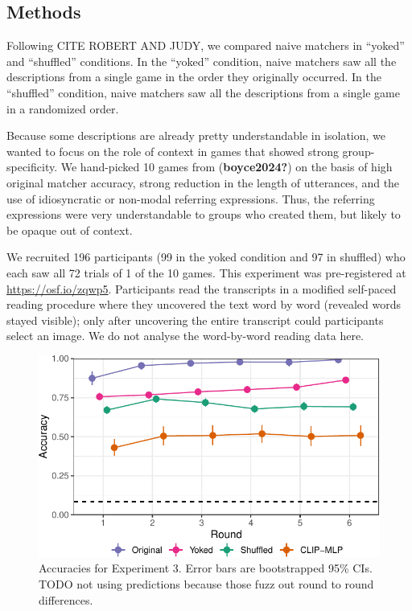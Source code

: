 \documentclass[10pt, letterpaper]{article}
\begin{document}
\subsection{Methods}\label{methods-1}

Following CITE ROBERT AND JUDY, we compared naive matchers in ``yoked''
and ``shuffled'' conditions. In the ``yoked'' condition, naive matchers
saw all the descriptions from a single game in the order they originally
occurred. In the ``shuffled'' condition, naive matchers saw all the
descriptions from a single game in a randomized order.

Because some descriptions are already pretty understandable in
isolation, we wanted to focus on the role of context in games that
showed strong group-specificity. We hand-picked 10 games from
(\textbf{boyce2024?}) on the basis of high original matcher accuracy,
strong reduction in the length of utterances, and the use of
idiosyncratic or non-modal referring expressions. Thus, the referring
expressions were very understandable to groups who created them, but
likely to be opaque out of context.

We recruited 196 participants (99 in the yoked condition and 97 in
shuffled) who each saw all 72 trials of 1 of the 10 games. This
experiment was pre-registered at \url{https://osf.io/zqwp5}.
Participants read the transcripts in a modified self-paced reading
procedure where they uncovered the text word by word (revealed words
stayed visible); only after uncovering the entire transcript could
participants select an image. We do not analyse the word-by-word reading
data here.

\begin{CodeChunk}
\begin{figure}[t]

{\centering \includegraphics[width=0.9\linewidth]{figs/fig-yoked-1} 

}

\caption[Accuracies for Experiment 3]{Accuracies for Experiment 3. Error bars are bootstrapped 95\% CIs. TODO not using predictions because those fuzz out round to round differences. \label{yoked}}\label{fig:fig-yoked}
\end{figure}
\end{CodeChunk}
\end{document}
